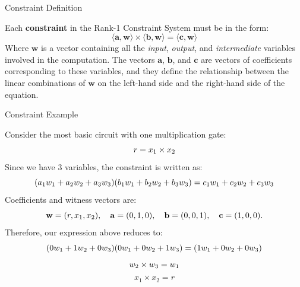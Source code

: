 \documentclass{beamer}
\begin{document}
    \begin{frame}{Constraint Definition}
        \begin{definition}
            Each \textbf{constraint} in the Rank-1 Constraint System must be in the form:
            \begin{equation*}
                \langle \mathbf{a}, \mathbf{w}\rangle \times \langle \mathbf{b}, \mathbf{w}\rangle = \langle \mathbf{c}, \mathbf{w}\rangle
            \end{equation*}
            Where $\mathbf{w}$ is a vector containing all the \textit{input}, \textit{output}, and 
            \textit{intermediate} variables involved in the computation. The vectors $\mathbf{a}$, 
            $\mathbf{b}$, and $\mathbf{c}$ are vectors of coefficients corresponding to these variables, 
            and they define the relationship between the linear combinations of $\mathbf{w}$ on the 
            left-hand side and the right-hand side of the equation.
        \end{definition}        
    \end{frame}

    \begin{frame}{Constraint Example}
        \begin{example}
            Consider the most basic circuit with one multiplication gate:
            \vspace{-5pt}
            \begin{equation*}
                r = x_1 \times x_2
                \vspace{-5pt}
            \end{equation*}
            Since we have $3$ variables, the constraint is written as:
            \vspace{-5pt}
            \begin{equation*}
                (a_1w_1 + a_2w_2 + a_3w_3)(b_1w_1 + b_2w_2 + b_3w_3) = c_1w_1 + c_2w_2 + c_3w_3
                \vspace{-5pt}
            \end{equation*}
            Coefficients and witness vectors are:
            \vspace{-5pt}
            \begin{equation*}
                \mathbf{w} = (r, x_1, x_2), \quad \mathbf{a} = (0, 1, 0), \quad \mathbf{b} = (0, 0, 1), \quad \mathbf{c} = (1, 0, 0). 
                \vspace{-5pt}
            \end{equation*}
            Therefore, our expression above reduces to:
            \vspace{-5pt}
            \[ (0w_1 + 1w_2 + 0w_3)(0w_1 + 0w_2 + 1w_3) = (1w_1 + 0w_2 + 0w_3) \vspace{-5pt} \]
            \[ w_2 \times w_3 = w_1 \vspace{-5pt} \]
            \[ x_1 \times x_2 = r \]
        \end{example}
    \end{frame}
\end{document}
